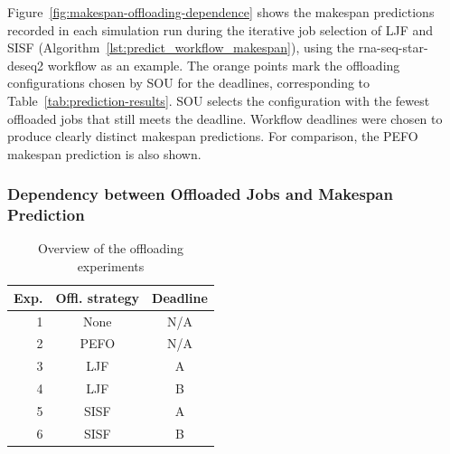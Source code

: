 Figure~\ref{fig:makespan-offloading-dependence} shows the makespan predictions recorded in each simulation run during the iterative job selection of LJF and SISF (Algorithm~\ref{lst:predict_workflow_makespan}), using the rna-seq-star-deseq2 workflow as an example. The orange points mark the offloading configurations chosen by SOU for the deadlines, corresponding to Table~\ref{tab:prediction-results}. SOU selects the configuration with the fewest offloaded jobs that still meets the deadline. Workflow deadlines were chosen to produce clearly distinct makespan predictions. For comparison, the PEFO makespan prediction is also shown. 

\subsubsection{Dependency between Offloaded Jobs and Makespan Prediction}

\begin{table}[t]
\caption{Overview of the offloading experiments}
\centering
\begin{tabular}{r|cc}
\textbf{Exp.} & \multicolumn{1}{l}{\textbf{Offl. strategy}} & \multicolumn{1}{l}{\textbf{Deadline}} \\
\hline
1                   & None                                        & N/A                                   \\
2                   & PEFO                                        & N/A                                   \\
3                   & LJF                                         & A                                     \\
4                   & LJF                                         & B                                     \\
5                   & SISF                                        & A                                     \\
6                   & SISF                                        & B                                    
\end{tabular}
\label{tab:offloading-experiments}
\end{table}

